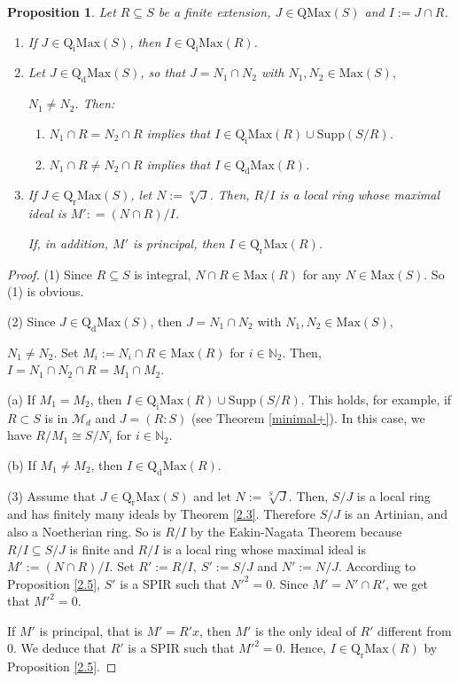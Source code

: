 \documentclass[12pt,leqno]{amsart}
\newtheorem{proposition}[theorem]{Proposition}
\theoremstyle{definition}
\begin{document}
\begin{proposition}\label{3.1} Let $R\subseteq S$ be a finite extension, $J\in\mathrm{QMax}(S)$ and  $I:=J\cap R$.
\begin{enumerate}
\item If $J\in\mathrm{Q_iMax}(S)$, then $I\in\mathrm{Q_iMax}(R)$. 
 \item Let $J\in\mathrm{Q_dMax}(S)$, so that $J=N_1\cap N_2$ with $N_1,N_2\in\mathrm{Max}(S),$
 
 \noindent$ N_1\neq N_2$. Then: 
\begin{enumerate}
\item $N_1\cap R=N_2\cap R$ implies that $I\in\mathrm{Q_iMax}(R)\cup\mathrm{Supp}(S/R)$. 
\item $N_1\cap R\neq N_2\cap R$ implies that $I\in\mathrm{Q_dMax}(R)$. 
\end{enumerate}
\item If $J\in\mathrm{Q_rMax}(S)$, let $N:=\sqrt[S]J$. Then, $R/I$ is a local ring whose maximal ideal is  $M': =(N\cap R)/I$. 

If, in addition, $M'$ is principal, then $I\in\mathrm{Q_rMax}(R)$. 
\end{enumerate}
\end{proposition}
\begin{proof} (1) Since $R\subseteq S$ is integral, $N\cap R\in\mathrm {Max}(R)$ for any $N\in\mathrm{Max}(S)$. So (1) is obvious.

(2) Since $J\in\mathrm{Q_dMax}(S)$, then $J=N_1\cap N_2$ with $N_1, N_2\in\mathrm {Max}(S),$

\noindent $N_1\neq N_2$. Set $M_i:=N_i\cap R\in\mathrm{Max}(R)$ for $i \in\mathbb N_2$. Then, $I=N_1\cap N_2\cap R=M_1\cap M_2$.   
 
(a) If $M_1=M_2$, then $I\in\mathrm{Q_iMax}(R)\cup\mathrm{Supp}(S/R)$. This holds, for example, if $R\subset S$ is in $\mathcal{M}_d$ and $J= (R:S)$ (see Theorem \ref{minimal+}). In this case, we have $R/M_1\cong S/N_i$ for $i\in\mathbb N_2$. 
 
 (b) If $M_1\neq M_2$, then $I\in\mathrm{Q_dMax}(R)$. 

(3) Assume that $J\in\mathrm{Q_rMax}(S)$ and let $N:=\sqrt[S]J$. Then, $ S/J$ is a local ring and has finitely many ideals by Theorem \ref{2.3}. Therefore $S/J$ is an Artinian, and also a Noetherian ring. So is $R/I$ by the Eakin-Nagata Theorem because $R/I\subseteq S/J$ is finite and $R/I$ is a local ring whose maximal ideal is $M':=(N\cap R)/I$. Set $R':=R/I,\ S':= S/J$ and $N':=N/J$. According to Proposition \ref{2.5}, $S'$ is a SPIR such that $N'^2=0$. Since $M'=N'\cap R'$, we get that $M'^2=0$. 

If $M'$ is principal, that is $M'=R'x$, then $M'$ is the only ideal of $R'$ different from $0$. We deduce that $R'$ is a SPIR such that $M'^2=0$. Hence, $I\in\mathrm{Q_rMax}(R)$ by Proposition \ref{2.5}.
\end{proof}
\end{document}

